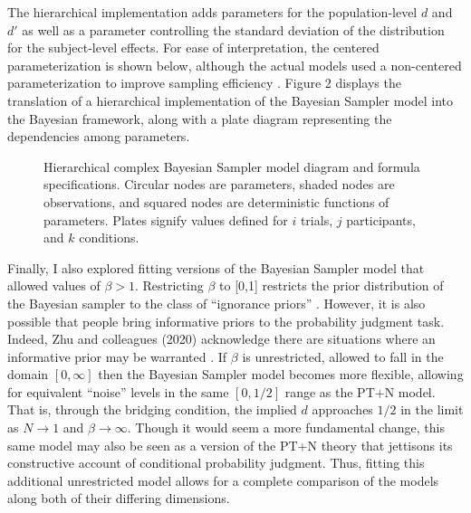 \documentclass[
  english,
  man,floatsintext]{apa6}
\begin{document}
The hierarchical implementation adds parameters for the population-level \(d\) and \(d'\) as well as a parameter controlling the standard deviation of the distribution for the subject-level effects. For ease of interpretation, the centered parameterization is shown below, although the actual models used a non-centered parameterization to improve sampling efficiency \autocite{papaspiliopoulos.etal2007}. Figure 2 displays the translation of a hierarchical implementation of the Bayesian Sampler model into the Bayesian framework, along with a plate diagram representing the dependencies among parameters.

\begin{figure}
  \begin{minipage}{.5\textwidth}
    \flushright
    
  \end{minipage}%
  \begin{minipage}{.5\textwidth}
    \flushleft
    \small
    
  \end{minipage}
  \caption{Hierarchical complex Bayesian Sampler model diagram and formula specifications. Circular nodes are parameters, shaded nodes are observations, and squared nodes are deterministic functions of parameters. Plates signify values defined for $i$ trials, $j$ participants, and $k$ conditions.}
\end{figure}

Finally, I also explored fitting versions of the Bayesian Sampler model that allowed values of \(\beta > 1\). Restricting \(\beta\) to {[}0,1{]} restricts the prior distribution of the Bayesian sampler to the class of ``ignorance priors'' \autocite{zhu.etal2020}. However, it is also possible that people bring informative priors to the probability judgment task. Indeed, Zhu and colleagues (2020) acknowledge there are situations where an informative prior may be warranted \autocite[see e.g.,][]{fennell.baddeley2012}. If \(\beta\) is unrestricted, allowed to fall in the domain \([0, \infty]\) then the Bayesian Sampler model becomes more flexible, allowing for equivalent ``noise'' levels in the same \([0, 1/2]\) range as the PT+N model. That is, through the bridging condition, the implied \(d\) approaches \(1/2\) in the limit as \(N \to 1\) and \(\beta \to \infty\). Though it would seem a more fundamental change, this same model may also be seen as a version of the PT+N theory that jettisons its constructive account of conditional probability judgment. Thus, fitting this additional unrestricted model allows for a complete comparison of the models along both of their differing dimensions.
\end{document}
